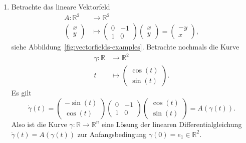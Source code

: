 \documentclass[../main.tex]{subfiles}
\begin{document}
\begin{examples}
  \leavevmode
  \begin{enumerate}[(1)]
    \item Betrachte das lineare Vektorfeld
      \begin{align*}
        A \colon \mathbb{R}^2 & \to \mathbb{R}^2 \\
        \begin{pmatrix}
          x \\ y
        \end{pmatrix}
         & \mapsto 
         \begin{pmatrix}
           0 & -1 \\ 1 & 0
         \end{pmatrix}
         \begin{pmatrix}
           x \\ y
         \end{pmatrix}
         =
         \begin{pmatrix}
           -y \\ x
         \end{pmatrix},
      \end{align*}
      siehe Abbildung~\ref{fig:vectorfields-examples}.
      Betrachte nochmals die Kurve
      \begin{align*}
        \gamma \colon \mathbb{R} & \to \mathbb{R}^2 \\
        t & \mapsto 
        \begin{pmatrix}
          \cos(t) \\ \sin(t)
        \end{pmatrix}.
      \end{align*}
      Es gilt
      \[
        \dot \gamma(t) =
        \begin{pmatrix}
          - \sin(t) \\ \cos(t)
        \end{pmatrix}
        \begin{pmatrix}
          0 & -1 \\ 1 & 0
        \end{pmatrix}
        \begin{pmatrix}
          \cos(t) \\ \sin(t)
        \end{pmatrix}
        = A(\gamma(t)).
      \]
      Also ist die Kurve $\gamma \colon \mathbb{R} \to \mathbb{R}^n$ 
      eine Lösung der linearen Differentialgleichung
      $\dot \gamma(t) = A(\gamma(t))$ 
      zur Anfangsbedingung $\gamma(0) = e_1 \in \mathbb{R}^2$.

\end{enumerate}
\end{examples}
\end{document}
